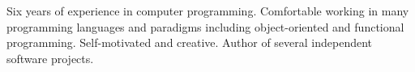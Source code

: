 

\begin{cvparagraph}

Six years of experience in computer programming. Comfortable
working in many programming languages and paradigms including
object-oriented and functional programming. Self-motivated and
creative. Author of several independent software projects.
\end{cvparagraph}
